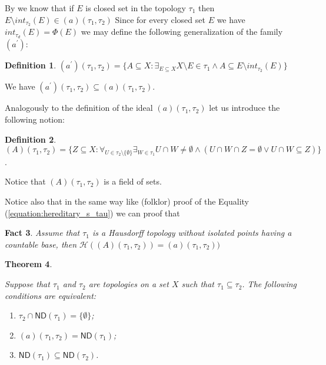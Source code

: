 \documentclass[12pt]{amsart}
\theoremstyle{plain}
\newtheorem{theorem}{Theorem}[section]
\newtheorem{fact}[theorem]{Fact}
\theoremstyle{definition}
\newtheorem{definition}[theorem]{Definition}
\theoremstyle{remark}
\newcommand{\real}{\mathbb{R}}
\newcommand{\cK}{{\mathcal K}}
\newcommand{\mathint}{\mathit{int}}
\newcommand{\aideal}{\mathit{(a)}}
\newcommand{\aidealprime}{\mathit{(a^\prime)}}
\newcommand{\Afield}{\mathit{(A)}}
\newcommand{\ND}{\mathsf{ND}}
\newcommand{\Hereditary}{\mathcal{H}}
\begin{document}
By \cite[Theorem 2.8]{N} we know that 
if $E$ is closed set in the topology $\tau_1$
then $E \setminus  \mathint_{\tau_2}(E) \in \aideal(\tau_1, \tau_2)$
Since for every closed set $E$ we have
$\mathint_{\tau_d}(E) = \Phi(E)$
we may define the following generalization of the family 
$\aidealprime$:
\begin{definition}
\label{definition:a_prime}
$\aidealprime(\tau_1, \tau_2) = \lbrace A \subseteq X\colon \exists_{E \subseteq X} 
X\setminus E \in \tau_1 \wedge A \subseteq E \setminus  \mathint_{\tau_2}(E) \rbrace$
\end{definition}

We have $\aidealprime(\tau_1, \tau_2) \subseteq \aideal(\tau_1, \tau_2)$.

Analogously to the definition of the ideal $\aideal(\tau_1, \tau_2)$ 
let us introduce the following notion:

\begin{definition}
\label{definition:field_A}
$\Afield(\tau_1, \tau_2) = \{ Z \subseteq X \colon
\forall_{U \in \tau_2 \setminus \{ \emptyset\}}
\exists_{W \in \tau_1} U \cap W \not= \emptyset \wedge
(U \cap W \cap Z = \emptyset \vee U \cap W \subseteq Z)\}$.
\end{definition}

Notice that $\Afield(\tau_1, \tau_2)$ is a field of sets.

Notice also that in the same way like (folklor) proof of 
the Equality (\ref{equation:hereditary_s_tau}) we can proof that 
\begin{fact}
\label{fact:hereditary_A}
Assume that $\tau_1$ is a Hausdorff topology without isolated points
having a countable base, then
$\Hereditary(\Afield(\tau_1, \tau_2)) = \aideal(\tau_1, \tau_2))$
\end{fact}

\begin{theorem}
\label{theorem:collapse-theorem}

Suppose that $\tau_1$ and $\tau_2$ are topologies on a set $X$ such
that $\tau_1 \subseteq \tau_2$.
The following conditions are equivalent:
\begin{enumerate}
\item $\tau_2 \cap \ND(\tau_1) = \lbrace \emptyset \rbrace$;
\item $\aideal(\tau_1, \tau_2) = \ND(\tau_1)$;
\item $\ND(\tau_1) \subseteq \ND(\tau_2)$.
\end{enumerate}
\end{theorem}
									
\end{document}
